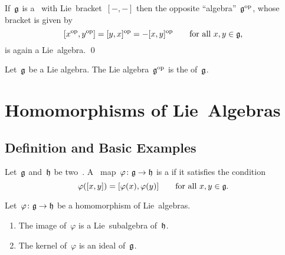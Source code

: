 \begin{proposition}
  If~$\mathfrak{g}$ is a~\liealgebra{$\kf$} with Lie~bracket~$[-,-]$ then the opposite \enquote{algebra}~$\mathfrak{g}^{\mathrm{op}}$, whose bracket is given by
  \[
    [x^{\mathrm{op}}, y^{\mathrm{op}}]
    =
    [y,x]^{\mathrm{op}}
    =
    -[x,y]^{\mathrm{op}}
    \qquad
    \text{for all~$x, y \in \mathfrak{g}$,}
  \]
  is again a Lie~algebra.
  \qed
\end{proposition}


\begin{definition}
  Let~$\mathfrak{g}$ be a Lie algebra.
  The Lie algebra~$\mathfrak{g}^{\mathrm{op}}$ is the  of~$\mathfrak{g}$.
\end{definition}





\section{Homomorphisms of Lie~Algebras}



\subsection{Definition and Basic Examples}


\begin{definition}
  Let~$\mathfrak{g}$ and~$\mathfrak{h}$ be two~\liealgebras{$\kf$}.
  A~\linear{$\kf$} map~$\varphi \colon \glie \to \hlie$ is a  if it satisfies the condition
 \[
   \varphi([x,y])
   =
   [\varphi(x), \varphi(y)]
   \qquad
   \text{for all~$x, y \in \mathfrak{g}$.}
 \]
\end{definition}


\begin{proposition}
  Let~$\varphi \colon \glie \to \hlie$ be a homomorphism of Lie~algebras.
  \begin{enumerate}
    \item
      The image of~$\varphi$ is a Lie~subalgebra of~$\mathfrak{h}$.
    \item
      The kernel of~$\varphi$ is an ideal of~$\mathfrak{g}$.
  \end{enumerate}
\end{proposition}


